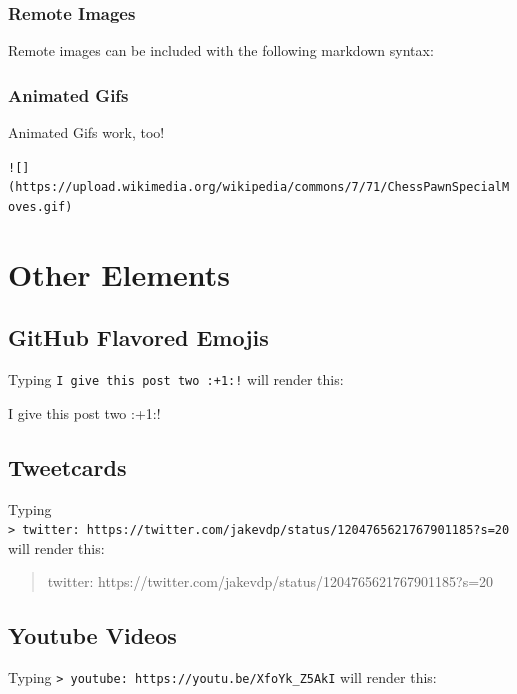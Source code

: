 \documentclass[11pt]{article}
\begin{document}
    \hypertarget{remote-images}{%
\subsubsection{Remote Images}\label{remote-images}}

Remote images can be included with the following markdown syntax:

    \hypertarget{animated-gifs}{%
\subsubsection{Animated Gifs}\label{animated-gifs}}

Animated Gifs work, too!

\texttt{!{[}{]}(https://upload.wikimedia.org/wikipedia/commons/7/71/ChessPawnSpecialMoves.gif)}

    \hypertarget{other-elements}{%
\section{Other Elements}\label{other-elements}}

    \hypertarget{github-flavored-emojis}{%
\subsection{GitHub Flavored Emojis}\label{github-flavored-emojis}}

Typing \texttt{I\ give\ this\ post\ two\ :+1:!} will render this:

I give this post two :+1:!

    \hypertarget{tweetcards}{%
\subsection{Tweetcards}\label{tweetcards}}

Typing
\texttt{\textgreater{}\ twitter:\ https://twitter.com/jakevdp/status/1204765621767901185?s=20}
will render this:

\begin{quote}
twitter: https://twitter.com/jakevdp/status/1204765621767901185?s=20
\end{quote}

    \hypertarget{youtube-videos}{%
\subsection{Youtube Videos}\label{youtube-videos}}

Typing \texttt{\textgreater{}\ youtube:\ https://youtu.be/XfoYk\_Z5AkI}
will render this:
\end{document}
